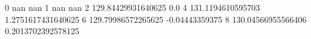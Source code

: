 0 nan nan
1 nan nan
2 129.84429931640625 0.0
4 131.1194610595703 1.2751617431640625
6 129.79986572265625 -0.04443359375
8 130.04566955566406 0.2013702392578125
